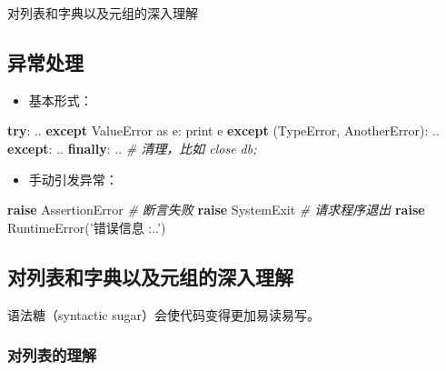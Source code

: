 \documentclass[utf-8]{ctexart}
\newenvironment{Shaded}{}{}
\newcommand{\StringTok}[1]{\textcolor[rgb]{0.25,0.44,0.63}{#1}}
\newcommand{\ImportTok}[1]{#1}
\newcommand{\CommentTok}[1]{\textcolor[rgb]{0.38,0.63,0.69}{\textit{#1}}}
\newcommand{\ControlFlowTok}[1]{\textcolor[rgb]{0.00,0.44,0.13}{\textbf{#1}}}
\newcommand{\BuiltInTok}[1]{#1}
\newcommand{\PreprocessorTok}[1]{\textcolor[rgb]{0.74,0.48,0.00}{#1}}
\newcommand{\NormalTok}[1]{#1}
\begin{document}
对列表和字典以及元组的深入理解

\hypertarget{header-n357}{\subsection{异常处理}\label{header-n357}}

\begin{itemize}
\item
  基本形式：
\end{itemize}

\begin{Shaded}
\begin{Highlighting}[]
\ControlFlowTok{try}\NormalTok{:}
\NormalTok{  ..}
\ControlFlowTok{except} \PreprocessorTok{ValueError} \ImportTok{as}\NormalTok{ e:}
  \BuiltInTok{print}\NormalTok{ e}
\ControlFlowTok{except}\NormalTok{ (}\PreprocessorTok{TypeError}\NormalTok{, AnotherError):}
\NormalTok{  ..}
\ControlFlowTok{except}\NormalTok{:}
\NormalTok{  ..}
\ControlFlowTok{finally}\NormalTok{:}
\NormalTok{  .. }\CommentTok{# 清理，比如 close db;}
\end{Highlighting}
\end{Shaded}

\begin{itemize}
\item
  手动引发异常：
\end{itemize}

\begin{Shaded}
\begin{Highlighting}[]
\ControlFlowTok{raise} \PreprocessorTok{AssertionError} \CommentTok{# 断言失败}
\ControlFlowTok{raise} \PreprocessorTok{SystemExit}
\CommentTok{# 请求程序退出}
\ControlFlowTok{raise} \PreprocessorTok{RuntimeError}\NormalTok{(}\StringTok{'错误信息 :..'}\NormalTok{)}
\end{Highlighting}
\end{Shaded}

\hypertarget{header-n369}{\subsection{对列表和字典以及元组的深入理解}\label{header-n369}}

语法糖（syntactic sugar）会使代码变得更加易读易写。

\subsubsection{对列表的理解}\label{header-n372}
\end{document}
